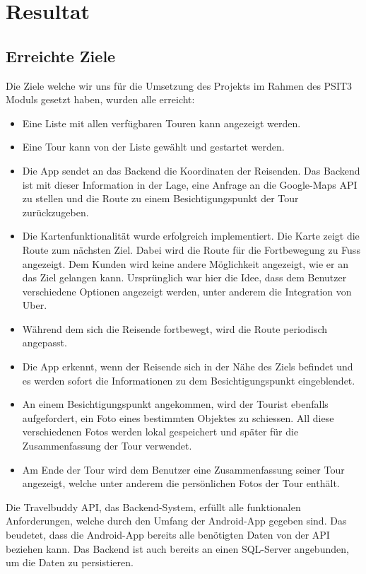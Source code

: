 \section{Resultat}\label{resultat}

\subsection{Erreichte Ziele}\label{erreichteZiele}

Die Ziele welche wir uns für die Umsetzung des Projekts im Rahmen des PSIT3 Moduls gesetzt haben, wurden alle erreicht:
\begin{itemize}
  \item Eine Liste mit allen verfügbaren Touren kann angezeigt werden.
  \item Eine Tour kann von der Liste gewählt und gestartet werden.
  \item Die App sendet an das Backend die Koordinaten der Reisenden. Das Backend ist mit dieser Information in der Lage, eine Anfrage an die Google-Maps API zu stellen und die Route zu einem Besichtigungspunkt der Tour zurückzugeben.
  \item Die Kartenfunktionalität wurde erfolgreich implementiert. Die Karte zeigt die Route zum nächsten Ziel. Dabei wird die Route für die Fortbewegung zu Fuss angezeigt. Dem Kunden wird keine andere Möglichkeit angezeigt, wie er an das Ziel gelangen kann. Ursprünglich war hier die Idee, dass dem Benutzer verschiedene Optionen angezeigt werden, unter anderem die Integration von Uber.
  \item Während dem sich die Reisende fortbewegt, wird die Route periodisch angepasst.
  \item Die App erkennt, wenn der Reisende sich in der Nähe des Ziels befindet und es werden sofort die Informationen zu dem Besichtigungspunkt eingeblendet.
  \item An einem Besichtigungspunkt angekommen, wird der Tourist ebenfalls aufgefordert, ein Foto eines bestimmten Objektes zu schiessen. All diese verschiedenen Fotos werden lokal gespeichert und später für die Zusammenfassung der Tour verwendet.
  \item Am Ende der Tour wird dem Benutzer eine Zusammenfassung seiner Tour angezeigt, welche unter anderem die persönlichen Fotos der Tour enthält.
\end{itemize}

Die Travelbuddy API, das Backend-System, erfüllt alle funktionalen Anforderungen, welche durch den Umfang der Android-App gegeben sind. Das beudetet, dass die Android-App bereits alle benötigten Daten von der API beziehen kann. Das Backend ist auch bereits an einen SQL-Server angebunden, um die Daten zu persistieren.


